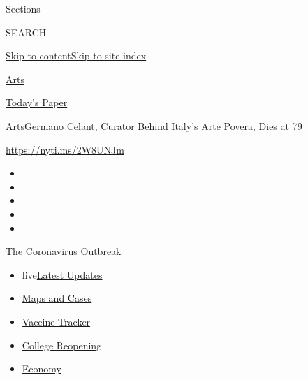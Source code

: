 Sections

SEARCH

\protect\hyperlink{site-content}{Skip to
content}\protect\hyperlink{site-index}{Skip to site index}

\href{https://www.nytimes.com/section/arts}{Arts}

\href{https://myaccount.nytimes.com/auth/login?response_type=cookie\&client_id=vi}{}

\href{https://www.nytimes.com/section/todayspaper}{Today's Paper}

\href{/section/arts}{Arts}\textbar{}Germano Celant, Curator Behind
Italy's Arte Povera, Dies at 79

\url{https://nyti.ms/2W8UNJm}

\begin{itemize}
\item
\item
\item
\item
\item
\end{itemize}

\href{https://www.nytimes.com/news-event/coronavirus?action=click\&pgtype=Article\&state=default\&region=TOP_BANNER\&context=storylines_menu}{The
Coronavirus Outbreak}

\begin{itemize}
\tightlist
\item
  live\href{https://www.nytimes.com/2020/08/03/world/coronavirus-covid-19.html?action=click\&pgtype=Article\&state=default\&region=TOP_BANNER\&context=storylines_menu}{Latest
  Updates}
\item
  \href{https://www.nytimes.com/interactive/2020/us/coronavirus-us-cases.html?action=click\&pgtype=Article\&state=default\&region=TOP_BANNER\&context=storylines_menu}{Maps
  and Cases}
\item
  \href{https://www.nytimes.com/interactive/2020/science/coronavirus-vaccine-tracker.html?action=click\&pgtype=Article\&state=default\&region=TOP_BANNER\&context=storylines_menu}{Vaccine
  Tracker}
\item
  \href{https://www.nytimes.com/2020/08/02/us/covid-college-reopening.html?action=click\&pgtype=Article\&state=default\&region=TOP_BANNER\&context=storylines_menu}{College
  Reopening}
\item
  \href{https://www.nytimes.com/live/2020/08/03/business/stock-market-today-coronavirus?action=click\&pgtype=Article\&state=default\&region=TOP_BANNER\&context=storylines_menu}{Economy}
\end{itemize}

